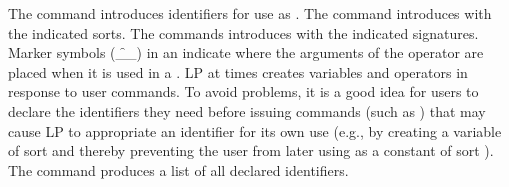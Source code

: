 The  command introduces identifiers for use as
.
\p
The  command introduces  with
the indicated sorts.
\p
The  commands introduces  with
the indicated signatures.  Marker symbols (\f{__}) in an  indicate
where the arguments of the operator are placed when it is used in a
.
\p
LP at times creates variables and operators in response to user commands.  To
avoid problems, it is a good idea for users to declare the identifiers they
need before issuing commands (such as ) that may cause LP to
appropriate an identifier for its own use (e.g., by creating a variable
 of sort  and thereby preventing the user from later
using  as a constant of sort ).
\p
The  command produces a list of all declared
identifiers.
